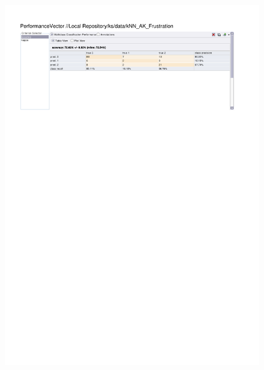 \begin{figure}[htp]
  \centerline{\includegraphics[trim=0 685 0 60,clip,width=16.09cm]{results/kNN_A_Frustration.pdf}} \caption{
} \label{kNN_K_Frustration}
\end{figure}

